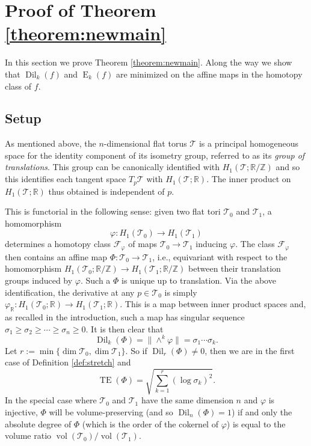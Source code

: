 \documentclass[11pt,letterpaper]{amsart}
\theoremstyle{definition}
\numberwithin{equation}{section}
\theoremstyle{definition}
\newcommand{\Fc}{\mathcal{F}}
\newcommand{\Tc}{\mathcal{T}}
\newcommand{\Rb}{\mathbb{R}}
\newcommand{\Zb}{\mathbb{Z}}
\DeclareMathOperator{\En}{E}
\DeclareMathOperator{\TE}{TE}
\newcommand{\Dil}{\operatorname{Dil}}
\newcommand{\vol}{\operatorname{vol}}
\begin{document}
\section{Proof of Theorem \ref{theorem:newmain}}\label{sect:proofs}

In this section we prove Theorem \ref{theorem:newmain}.  Along the way we show that $\Dil_k(f)$ and $\En_k(f)$ are minimized on the affine maps in the homotopy class of $f$.

\subsection{Setup}  As mentioned above, the $n$-dimensional flat torus $\Tc$ is a principal homogeneous space for  the identity component of its  isometry group, referred to as its {\em group of  translations}. This group can be canonically identified with $H_1(\Tc; \Rb/\Zb)$ and so this  identifies each 
tangent space $T_p\Tc$ with $H_1(\Tc; \Rb)$. The inner product on $H_1(\Tc; \Rb)$ thus obtained  is independent of $p$.

This is functorial in the following sense:  given two flat  tori $\Tc_0$ and $\Tc_1$, a homomorphism 
\[\varphi: H_1(\Tc_0)\to H_1(\Tc_1)\] determines  a homotopy class $\Fc_\varphi$ of maps 
$\Tc_0\to\Tc_1$ inducing $\varphi$.  The class $\Fc_\varphi$ then contains an affine map $\Phi: \Tc_0
\to \Tc_1$, i.e.,   equivariant with respect to the homomorphism $H_1(\Tc_0; \Rb/\Zb)\to H_1(\Tc_1; \Rb/\Zb)$  between their translation groups induced by $\varphi$. Such a $\Phi$ is unique up to translation. Via the above identification, the derivative at any $p\in \Tc_0$ is simply 
$\varphi_\Rb: H_1(\Tc_0; \Rb)\to H_1(\Tc_1; \Rb)$. This is a map between inner product spaces and, as recalled in the introduction, such a map has singular sequence $\sigma_1\geq \sigma_2\geq\cdots\geq \sigma_n\geq 0$.
It is then clear that 
\[
\Dil_k(\Phi)=\|\wedge^k \varphi\|=\sigma_1\cdots\sigma_k.
\]
Let $r:=\min\{\dim \Tc_0, \dim\Tc_1\}$. So if $\Dil_r(\Phi)\not=0$,  then we are in the first case of Definition \ref{def:stretch} and
\[
\textstyle \TE(\Phi)=\sqrt{\sum_{k=1}^r (\log \sigma_k)^2}.
\]
In the special case where $\Tc_0$ and $\Tc_1$ have the same dimension $n$ and $\varphi$ is injective, $\Phi$ will be volume-preserving (and so $\Dil_n(\Phi)=1$)  if and only the  absolute degree of $\Phi$ (which is the order of the cokernel of $\varphi$) is equal to the volume ratio  $\vol(\Tc_0)/\vol(\Tc_1)$.
\end{document}
